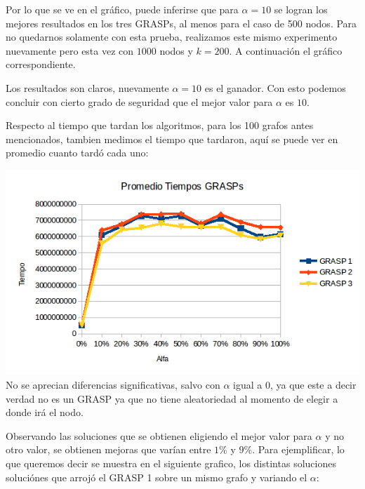 Por lo que se ve en el gráfico, puede inferirse que para $\alpha=10$ se logran los mejores resultados en los tres GRASPs, al menos para el caso de 500 nodos. Para no quedarnos solamente con esta prueba, realizamos este mismo experimento nuevamente pero esta vez con $1000$ nodos y $k=200$. A continuación el gráfico correspondiente.


Los resultados son claros, nuevamente $\alpha=10$ es el ganador. Con esto podemos concluir con cierto grado de seguridad que el mejor valor para $\alpha$ es $10$.

Respecto al tiempo que tardan los algoritmos, para los 100 grafos antes mencionados, tambien medimos el tiempo que tardaron, aquí se puede ver en promedio cuanto tardó cada uno:

\includegraphics[scale=0.7]{Ej5/tiemposAlfa.png}\\

No se aprecian diferencias significativas, salvo con $\alpha$ igual a 0, ya que este a decir verdad no es un GRASP ya que no tiene aleatoriedad al momento de elegir a donde irá el nodo.


Observando las soluciones que se obtienen eligiendo el mejor valor para $\alpha$ y no otro valor, se obtienen mejoras que varían entre $1\%$ y $9\%$. Para ejemplificar, lo que queremos decir se muestra en el siguiente grafico, los distintas soluciones soluciónes que arrojó el GRASP 1 sobre un mismo grafo y variando el $\alpha$:

